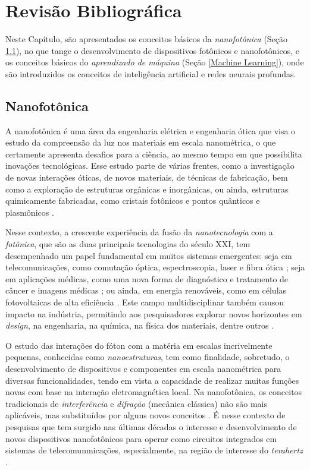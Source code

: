 \chapter{Revisão Bibliográfica}      \label{Revisao Bibliografica}

Neste Capítulo, são apresentados os conceitos básicos da \textit{nanofotônica} (Seção \ref{Nanofotonica}), no que tange o desenvolvimento de dispositivos fotônicos e nanofotônicos, e os conceitos básicos do \textit{aprendizado de máquina} (Seção \ref{Machine Learning}), onde são introduzidos os conceitos de inteligência artificial e redes neurais profundas.

\section{Nanofotônica}      \label{Nanofotonica}

A nanofotônica é uma área da engenharia elétrica e engenharia ótica que visa o estudo da compreensão da luz nos materiais em escala nanométrica, o que certamente apresenta desafios para a ciência, ao mesmo tempo em que possibilita inovações tecnológicas. Esse estudo parte de várias frentes, como a investigação de novas interações óticas, de novos materiais, de técnicas de fabricação, bem como a exploração de estruturas orgânicas e inorgânicas, ou ainda, estruturas quimicamente fabricadas, como cristais fotônicos e pontos quânticos e plasmônicos \cite{ohtsu2008principles,shen2002nanophotonics}.

Nesse contexto, a crescente experiência da fusão da \textit{nanotecnologia} com a \textit{fotônica}, que são as duas principais tecnologias do século XXI, tem desempenhado um papel fundamental em muitos sistemas emergentes: seja em telecomunicações, como comutação óptica, espectroscopia, laser e fibra ótica \cite{Sumetsky2013Nanophotonics,6065798}; seja em aplicações médicas, como uma nova forma de diagnóstico e tratamento de câncer e imagens médicas \cite{Yunrun2021Application}; ou ainda, em energia renováveis, como em células fotovoltaicas de alta eficiência \cite{Albert2016Photovoltaic}. Este campo multidisciplinar também causou impacto na indústria, permitindo aos pesquisadores explorar novos horizontes em \textit{design}, na engenharia, na química, na física dos materiais, dentre outros \cite{kittel1996introduction,Joannopoulos:08:Book}.

O estudo das interações do fóton com a matéria em escalas incrivelmente pequenas, conhecidas como \textit{nanoestruturas}, tem como finalidade, sobretudo, o desenvolvimento de dispositivos e componentes em escala nanométrica para diversas funcionalidades, tendo em vista a capacidade de realizar muitas funções novas com base na interação eletromagnética local. Na nanofotônica, os conceitos tradicionais de \textit{interferência} e \textit{difração} (mecânica clássica) não são mais aplicáveis, mas substituídos por alguns novos conceitos \cite{band2013quantum,Joannopoulos:08:Book}. É nesse contexto de pesquisas que tem surgido nas últimas décadas o interesse e desenvolvimento de novos dispositivos nanofotônicos para operar como circuitos integrados em sistemas de telecomunmicações, especialmente, na região de interesse do \textit{terahertz} \cite{ghann2017terahertz,williams2007terahertz}.

